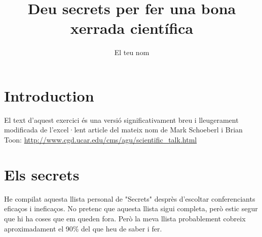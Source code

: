 \documentclass[12pt]{article}
\title{Deu secrets per fer una bona xerrada científica}
\author{El teu nom}
\begin{document}
\maketitle

\section{Introduction}

El text d'aquest exercici és una versió significativament breu i lleugerament modificada de l'excel·lent article del mateix nom de Mark Schoeberl i Brian Toon:
\url {http://www.cgd.ucar.edu/cms/agu/scientific_talk.html}

\section{Els secrets}

He compilat aquesta llista personal de "Secrets" desprès d'escoltar conferenciants eficaços i ineficaços. No pretenc que aquesta llista sigui completa, però estic segur que hi ha coses que em queden fora. Però la meva llista probablement cobreix aproximadament el 90\% del que heu de saber i fer.
\end{document}
